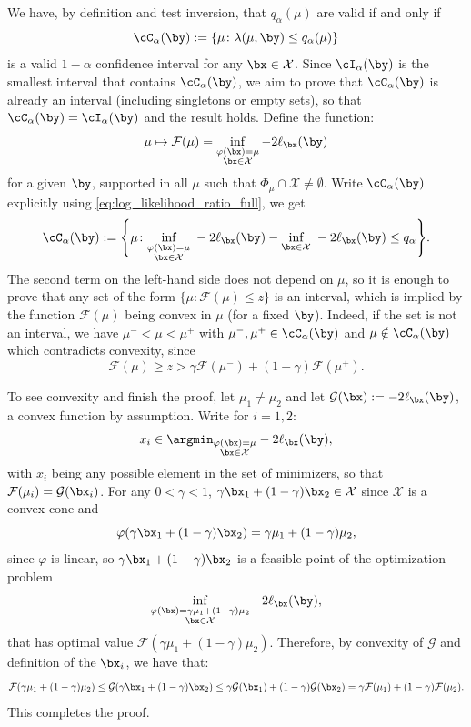 \documentclass[11pt]{article}
\numberwithin{equation}{section}
\numberwithin{figure}{section}
\begin{document}
We have, by definition and test inversion, that $q_\alpha(\mu)$ are valid if and only if 
\[
    \cC_\alpha(\by) := \{\mu \colon \lambda(\mu, \by) \leq q_\alpha(\mu)\}
\]
is a valid $1-\alpha$ confidence interval for any $\bx \in \mathcal{X}$. 
Since $\cI_\alpha(\by)$ is the smallest interval that contains $\cC_\alpha(\by)$, we aim to prove that  $\cC_\alpha(\by)$ is already an interval (including singletons or empty sets), so that $\cC_\alpha(\by) = \cI_\alpha(\by)$ and the result holds. 
Define the function:
\begin{equation}
    \mu \mapsto \mathcal{F}(\mu) = \inf_{\substack{\varphi(\bx) = \mu \\ \bx \in \mathcal{X}}} -2\ell_\bx(\by)
\end{equation}
for a given $\by$, supported in all $\mu$ such that $\Phi_\mu \cap \mathcal X \neq \emptyset$. 
Write $\cC_\alpha(\by)$ explicitly using \eqref{eq:log_likelihood_ratio_full}, we get
\begin{equation}
    \cC_\alpha(\by) := 
    \Bigg \{\mu \colon  \underset{\substack{\varphi(\bx) = \mu \\ \bx \in \mathcal{X}}} {\text{inf}} \; -2\ell_{\bx}(\by)- \underset{\bx \in \mathcal{X}}{\text{inf}} \; -2 \ell_{\bx}(\by) \leq q_\alpha \Bigg \}.
\end{equation}
The second term on the left-hand side does not depend on $\mu$, so it is enough to prove that any set of the form $\{\mu \colon \mathcal{F}(\mu) \leq z\}$ is an interval, which is implied by the function $\mathcal{F}(\mu)$ being convex in $\mu$ (for a fixed $\by$). 
Indeed, if the set is not an interval, we have $\mu^- < \mu < \mu^+$ with $\mu^-, \mu^+ \in \cC_\alpha(\by)$ and $\mu \notin \cC_\alpha(\by)$ which contradicts convexity, since 
\[
    \mathcal{F}(\mu) \geq z > \gamma \mathcal{F}(\mu^-) + (1-\gamma)\mathcal{F}(\mu^+).
\]

To see convexity and finish the proof, let $\mu_1 \neq \mu_2$ and let $\mathcal{G}(\bx) := -2\ell_\bx(\by)$, a convex function by assumption. 
Write for $i = 1,2$:
\[
    x_i \in \argmin_{\substack{\varphi(\bx) = \mu \\ \bx \in \mathcal{X}}} -2\ell_\bx(\by), 
\]
with $x_i$ being any possible element in the set of minimizers, so that $\mathcal{F}(\mu_i) = \mathcal{G}(\bx_i)$. 
For any $0 < \gamma < 1$, $\gamma \bx_1 + (1-\gamma) \bx_2 \in \mathcal X$ since $\mathcal X$ is a convex cone and 
\[
    \varphi(\gamma \bx_1 + (1-\gamma) \bx_2) = \gamma \mu_1 + (1-\gamma)\mu_2,
\]
since $\varphi$ is linear, so $\gamma \bx_1 + (1-\gamma) \bx_2$ is a feasible point of the optimization problem 
\[
\inf_{\substack{\varphi(\bx) = \gamma \mu_1 + (1-\gamma)\mu_2 \\ \bx \in \mathcal{X}}} -2\ell_\bx(\by),
\]
that has optimal value $\mathcal{F}(\gamma\mu_1 + (1-\gamma)\mu_2)$.
Therefore, by convexity of $\mathcal G$ and definition of the $\bx_i$, we have that:
\begin{equation}
    \mathcal{F}(\gamma\mu_1 + (1-\gamma)\mu_2) \leq \mathcal G(\gamma \bx_1 + (1-\gamma) \bx_2) \leq \gamma \mathcal G(\bx_1) + (1-\gamma) \mathcal{G}(\bx_2) = \gamma \mathcal F(\mu_1) + (1-\gamma) \mathcal{F}(\mu_2).
\end{equation}
This completes the proof.
\end{document}
